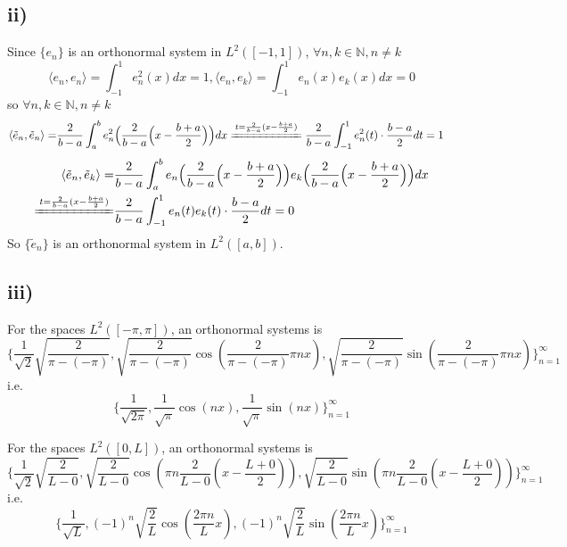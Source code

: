 \documentclass[a4paper,12pt,titlepage]{article}
\begin{document}
\subsection*{ii)}
Since $\lbrace e_n\rbrace$ is an orthonormal system in $L^2([-1,1])$, $\forall n,k\in\mathbb{N},n\neq k$
$$\langle e_n,e_n\rangle=\int_{-1}^1e^2_n(x)dx=1,\langle e_n,e_k\rangle=\int_{-1}^1e_n(x)e_k(x)dx=0$$
so $\forall n,k\in\mathbb{N},n\neq k$
\begin{align*}
\langle \tilde{e}_n,\tilde{e}_n\rangle=&\dfrac{2}{b-a}\int_{a}^be^2_n\Big(\dfrac{2}{b-a}\Big(x-\dfrac{b+a}{2}\Big)\Big)dx\xlongequal{t=\frac{2}{b-a}(x-\frac{b+a}{2})}\dfrac{2}{b-a}\int_{-1}^{1}e^2_n(t)\cdot\dfrac{b-a}{2}dt=1
\end{align*}
\begin{align*}
\langle \tilde{e}_n,\tilde{e}_k\rangle=&\dfrac{2}{b-a}\int_{a}^be_n\Big(\dfrac{2}{b-a}\Big(x-\dfrac{b+a}{2}\Big)\Big)e_k\Big(\dfrac{2}{b-a}\Big(x-\dfrac{b+a}{2}\Big)\Big)dx\\\xlongequal{t=\frac{2}{b-a}(x-\frac{b+a}{2})}&\dfrac{2}{b-a}\int_{-1}^{1}e_n(t)e_k(t)\cdot\dfrac{b-a}{2}dt=0
\end{align*}
So $\lbrace \tilde{e}_n\rbrace$ is an orthonormal system in $L^2([a, b])$.
\subsection*{iii)}
For the spaces $L^2([-\pi,\pi])$, an orthonormal systems is
$$\lbrace \dfrac{1}{\sqrt{2}}\sqrt{\dfrac{2}{\pi-(-\pi)}},\sqrt{\dfrac{2}{\pi-(-\pi)}}\cos(\dfrac{2}{\pi-(-\pi)}\pi nx),\sqrt{\dfrac{2}{\pi-(-\pi)}}\sin(\dfrac{2}{\pi-(-\pi)}\pi nx)\rbrace_{n=1}^{\infty}$$
i.e.
$$\lbrace \dfrac{1}{\sqrt{2\pi}},\dfrac{1}{\sqrt{\pi}}\cos(nx),\dfrac{1}{\sqrt{\pi}}\sin(nx)\rbrace_{n=1}^{\infty}$$

For the spaces $L^2([0,L])$, an orthonormal systems is
$$\lbrace \dfrac{1}{\sqrt{2}}\sqrt{\dfrac{2}{L-0}},\sqrt{\dfrac{2}{L-0}}\cos(\pi n\dfrac{2}{L-0}(x-\dfrac{L+0}{2})),\sqrt{\dfrac{2}{L-0}}\sin(\pi n\dfrac{2}{L-0}(x-\dfrac{L+0}{2}))\rbrace_{n=1}^{\infty}$$
i.e.
$$\lbrace \dfrac{1}{\sqrt{L}},(-1)^n\sqrt{\dfrac{2}{L}}\cos(\dfrac{2\pi n}{L}x),(-1)^n\sqrt{\dfrac{2}{L}}\sin(\dfrac{2\pi n}{L}x)\rbrace_{n=1}^{\infty}$$
\end{document}
